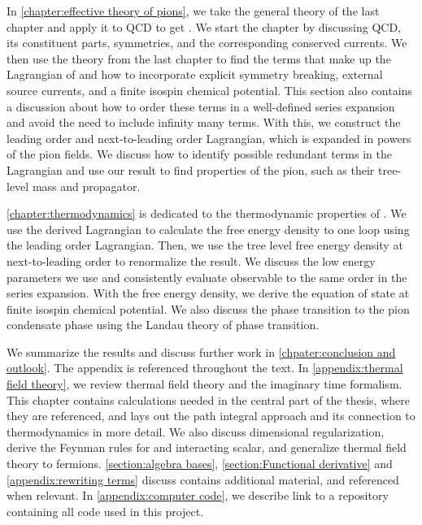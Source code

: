 In \autoref{chapter:effective theory of pions}, we take the general theory of the last chapter and apply it to QCD to get \chpt.
We start the chapter by discussing QCD, its constituent parts, symmetries, and the corresponding conserved currents.
We then use the theory from the last chapter to find the terms that make up the Lagrangian of \chpt and how to incorporate explicit symmetry breaking, external source currents, and a finite isospin chemical potential.
This section also contains a discussion about how to order these terms in a well-defined series expansion and avoid the need to include infinity many terms.
With this, we construct the leading order and next-to-leading order Lagrangian, which is expanded in powers of the pion fields.
We discuss how to identify possible redundant terms in the Lagrangian and use our result to find properties of the pion, such as their tree-level mass and propagator.

\cref{chapter:thermodynamics} is dedicated to the thermodynamic properties of \chpt.
We use the derived Lagrangian to calculate the free energy density to one loop using the leading order Lagrangian.
Then, we use the tree level free energy density at next-to-leading order to renormalize the result.
We discuss the low energy parameters we use and consistently evaluate observable to the same order in the series expansion.
With the free energy density, we derive the equation of state at finite isospin chemical potential.
We also discuss the phase transition to the pion condensate phase using the Landau theory of phase transition.

We summarize the results and discuss further work in \autoref{chpater:conclusion and outlook}.
The appendix is referenced throughout the text.
In \autoref{appendix:thermal field theory}, we review thermal field theory and the imaginary time formalism.
This chapter contains calculations needed in the central part of the thesis, where they are referenced, and lays out the path integral approach and its connection to thermodynamics in more detail.
We also discuss dimensional regularization, derive the Feynman rules for and interacting scalar, and generalize thermal field theory to fermions.
\autoref{section:algebra bases}, \autoref{section:Functional derivative} and \autoref{appendix:rewriting terms} discuss contains additional material, and referenced when relevant.
In \autoref{appendix:computer code}, we describe link to a repository containing all code used in this project.
